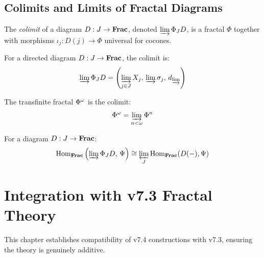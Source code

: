 \section{Colimits and Limits of Fractal Diagrams}

\begin{definition}
\label{def:colimit-frac}
The \emph{colimit} of a diagram $D: J \to \mathbf{Frac}$, denoted $\varinjlim\Phi_J D$,
is a fractal $\Phi$ together with morphisms $\iota_j: D(j) \to \Phi$ universal
for cocones.
\end{definition}

\begin{theorem}
\label{thm:colimit-construction}
For a directed diagram $D: J \to \mathbf{Frac}$, the colimit is:
\[
    \varinjlim\Phi_J D = \left(\varinjlim_{j \in J} X_j,\,
    \varinjlim \sigma_j,\, d_{\varinjlim}\right)
\]
\end{theorem}

\begin{example}
\label{ex:colimit-iteration}
The transfinite fractal $\Phi^{\omega}$ is the colimit:
\[
    \Phi^{\omega} = \varinjlim_{n < \omega} \Phi^{n}
\]
\end{example}

\begin{theorem}
\label{thm:lim-colim-duality}
For a diagram $D: J \to \mathbf{Frac}$:
\[
    \mathrm{Hom}_{\mathbf{Frac}}\left(\varinjlim\Phi_J D,\, \Psi\right) \cong
    \varprojlim_J \mathrm{Hom}_{\mathbf{Frac}}(D(-), \Psi)
\]
\end{theorem}


\chapter{Integration with v7.3 Fractal Theory}
\label{ch:integration}

\begin{tcolorbox}[colback=green!5!white,colframe=green!75!black,title=\textbf{Compatibility}]
This chapter establishes compatibility of v7.4 constructions with v7.3,
ensuring the theory is genuinely additive.
\end{tcolorbox}

